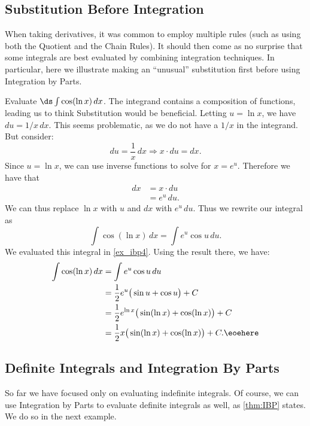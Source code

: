 \subsection{Substitution Before Integration}

When taking derivatives, it was common to employ multiple rules (such as using both the Quotient and the Chain Rules). It should then come as no surprise that some integrals are best evaluated by combining integration techniques. In particular, here we illustrate making an ``unusual'' substitution first before using Integration by Parts.

\begin{example}\label{ex_ibp8}
Evaluate $\ds \int \cos(\ln x)\, dx$.
\solution
The integrand contains a composition of functions, leading us to think Substitution would be beneficial. Letting $u=\ln x$, we have $du = 1/x\, dx$. This seems problematic, as we do not have a $1/x$ in the integrand. But consider:
\[du = \frac 1x\, dx \Rightarrow x\cdot du = dx.\]
Since $u = \ln x$, we can use inverse functions to solve for $x = e^u$. Therefore we have that
\begin{align*}
dx &= x\cdot du \\
		&= e^u\, du.
\end{align*}
We can thus replace $\ln x$ with $u$ and $dx$ with $e^u\, du$. Thus we rewrite our integral as 
\[\int \cos(\ln x)\, dx = \int e^u\cos u \, du.\]
We evaluated this integral in \autoref{ex_ibp4}. Using the result there, we have:
\begin{align*}
\int \cos(\ln x)\, dx &= \int e^u\cos u \, du \\
				&= \frac12e^u\big(\sin u + \cos u\big) + C \\
				&= \frac12e^{\ln x} \big(\sin(\ln x) + \cos (\ln x)\big)+C\\
				&= \frac12x \big(\sin(\ln x) + \cos (\ln x)\big)+C.\eoehere
\end{align*}
\end{example}

\subsection{Definite Integrals and Integration By Parts}

So far we have focused only on evaluating indefinite integrals. Of course, we can use Integration by Parts to evaluate definite integrals as well, as \autoref{thm:IBP} states. We do so in the next example.

